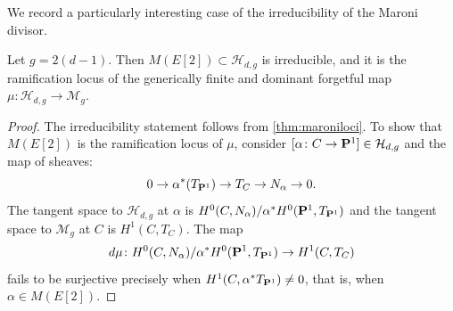 \documentclass{article}
\renewcommand {\P}{{\bf P}}
\providecommand {\from}{{\colon}}
\renewcommand{\H}{\mathcal H}
\newcommand{\M}{\mathcal M}
\numberwithin{equation}{section}
\begin{document}
We record a particularly interesting case of the irreducibility of the Maroni divisor.
\begin{corollary}\label{giesekerpetri}
  Let $g=2(d-1)$. Then $M(E[2]) \subset \H_{d,g}$ is irreducible, and it is the ramification locus of the generically finite and dominant forgetful map $\mu \from \H_{d,g} \to \mathcal{M}_g$. 
\end{corollary}
\begin{proof}
The irreducibility statement follows from \autoref{thm:maroniloci}. To show that $M(E[2])$ is the ramification locus of $\mu$, consider $[\alpha \from C \to \P^1] \in \H_{d,g}$ and the map of sheaves: 
\[ 0 \to \alpha^{*}(T_{\P^1}) \to T_C \to N_{\alpha}\to 0.\]
The tangent space to $\H_{d,g}$ at $\alpha$ is $H^0(C, N_\alpha)/\alpha^*H^0(\P^1, T_{\P^1})$ and the tangent space to $\M_g$ at $C$ is $H^1(C, T_C)$. The map
 \[d\mu \from H^{0}(C, N_{\alpha})/\alpha^{*}H^{0}(\P^1, T_{\P^1}) \to H^{1}(C, T_C)\]
fails to be surjective precisely when $H^1(C, \alpha^*T_{\P^1}) \neq 0$, that is, when $\alpha \in M(E[2])$.
\end{proof}
\end{document}
